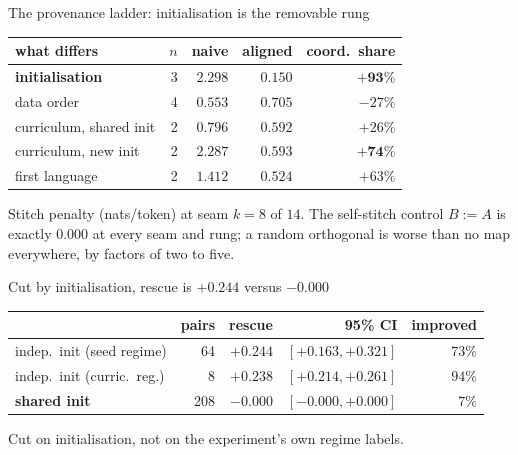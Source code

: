 \documentclass{beamer}
\begin{document}
\begin{frame}{The provenance ladder: initialisation is the removable rung}
  \centering
  \small
  \small
\begin{tabular}{lrrrr}
\toprule
what differs & $n$ & naive & aligned & coord.\ share \\
\midrule
\textbf{initialisation}       & 3 & $2.298$ & $\mathbf{0.150}$ & $\mathbf{+93\%}$ \\
data order                    & 4 & $0.553$ & $0.705$ & $-27\%$ \\
curriculum, shared init       & 2 & $0.796$ & $0.592$ & $+26\%$ \\
curriculum, new init          & 2 & $2.287$ & $0.593$ & $\mathbf{+74\%}$ \\
first language                & 2 & $1.412$ & $0.524$ & $+63\%$ \\
\bottomrule
\end{tabular}
  \vspace{0.8em}
  \begin{minipage}{0.92\textwidth}\footnotesize Stitch penalty (nats/token) at seam $k{=}8$ of $14$. The self-stitch control $B{:=}A$ is
exactly $0.000$ at every seam and rung; a random orthogonal is worse than no map everywhere, by
factors of two to five.\end{minipage}
\end{frame}

\begin{frame}{Cut by initialisation, rescue is $+0.244$ versus $-0.000$}
  \centering
  \small
  \small
\begin{tabular}{lrrrr}
\toprule
& pairs & rescue & 95\% CI & improved \\
\midrule
indep.\ init (seed regime)  & 64  & $+0.244$ & $[+0.163,+0.321]$ & $73\%$ \\
indep.\ init (curric.\ reg.)& 8   & $+0.238$ & $[+0.214,+0.261]$ & $94\%$ \\
\textbf{shared init}        & 208 & $-0.000$ & $[-0.000,+0.000]$ & $7\%$ \\
\bottomrule
\end{tabular}
  \vspace{0.8em}
  \begin{minipage}{0.92\textwidth}\footnotesize Cut on initialisation, not on the experiment's own regime labels.\end{minipage}
\end{frame}
\end{document}
